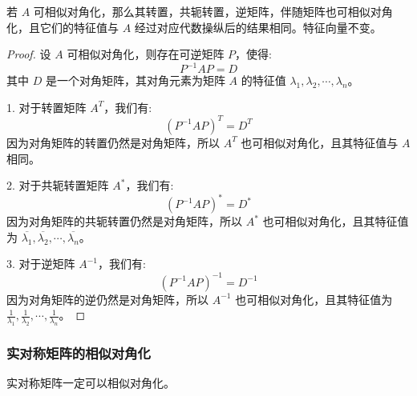 \documentclass[a4paper,12pt]{ctexart}
\begin{document}
\begin{mythm}{}{}
    若 $A$ 可相似对角化，那么其转置，共轭转置，逆矩阵，伴随矩阵也可相似对角化，且它们的特征值与 $A$ 经过对应代数操纵后的结果相同。特征向量不变。
\end{mythm}
\begin{proof}
    设 $A$ 可相似对角化，则存在可逆矩阵 $P$，使得:
    \[
    P^{-1} A P = D
    \]
    其中 $D$ 是一个对角矩阵，其对角元素为矩阵 $A$ 的特征值 $\lambda_1, \lambda_2, \cdots, \lambda_n$。
    
    1. 对于转置矩阵 $A^T$，我们有:
    \[
    (P^{-1} A P)^T = D^T
    \]
    因为对角矩阵的转置仍然是对角矩阵，所以 $A^T$ 也可相似对角化，且其特征值与 $A$ 相同。
    
    2. 对于共轭转置矩阵 $A^*$，我们有:
    \[
    (P^{-1} A P)^* = D^*
    \]
    因为对角矩阵的共轭转置仍然是对角矩阵，所以 $A^*$ 也可相似对角化，且其特征值为 $\overline{\lambda_1}, \overline{\lambda_2}, \cdots, \overline{\lambda_n}$。
    
    3. 对于逆矩阵 $A^{-1}$，我们有:
    \[
    (P^{-1} A P)^{-1} = D^{-1}
    \]
    因为对角矩阵的逆仍然是对角矩阵，所以 $A^{-1}$ 也可相似对角化，且其特征值为 $\frac{1}{\lambda_1}, \frac{1}{\lambda_2}, \cdots, \frac{1}{\lambda_n}$。
\end{proof}

\subsubsection{实对称矩阵的相似对角化}

\begin{mythm}{}{}
    实对称矩阵一定可以相似对角化。
\end{mythm}
\end{document}
